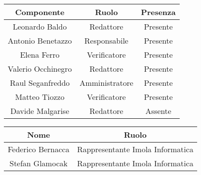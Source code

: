 \documentclass[italian,12pt]{article} %
\begin{document}
\begin{flushleft}
	\begin{table}[!h]
	\begin{tabular}{ |c|c|c| } 
		\hline
		\textbf{Componente} & \textbf{Ruolo} & \textbf{Presenza} \\
		\hline 
		Leonardo Baldo 		& Redattore & Presente \\ 
		Antonio Benetazzo 	& Responsabile & Presente \\
		Elena Ferro 		& Verificatore & Presente \\
		Valerio Occhinegro 	& Redattore & Presente \\
		Raul Seganfreddo 	& Amministratore & Presente \\
		Matteo Tiozzo 		& Verificatore & Presente \\ 
		Davide Malgarise 	& Redattore & Assente \\
		\hline
	\end{tabular}

	\vspace{1cm}

	\begin{tabular}{ |c|c| } 
		\hline
		\textbf{Nome} & \textbf{Ruolo} \\
		\hline 
		Federico Bernacca & Rappresentante Imola Informatica \\
		Stefan Glamocak & Rappresentante Imola Informatica \\

		\hline
	\end{tabular}
\end{table}

\end{flushleft}


\newpage
\end{document}
